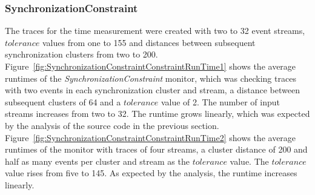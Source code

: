 \subsubsection{SynchronizationConstraint}
The traces for the time measurement were created with two to 32 event streams, $tolerance$ values from one to 155 and distances between subsequent synchronization clusters from two to 200.\\
Figure~\ref{fig:SynchronizationConstraintConstraintRunTime1} shows the average runtimes of the \textit{SynchronizationConstraint} monitor, which was checking traces with two events in each synchronization cluster and stream, a distance between subsequent clusters of 64 and a $tolerance$ value of 2. The number of input streams increases from two to 32. The runtime grows linearly, which was expected by the analysis of the source code in the previous section. \\
Figure~\ref{fig:SynchronizationConstraintConstraintRunTime2} shows the average runtimes of the monitor with traces of four streams, a cluster distance of 200 and half as many events per cluster and stream as the $tolerance$ value. The $tolerance$ value rises from five to 145. As expected by the analysis, the runtime increases linearly.
